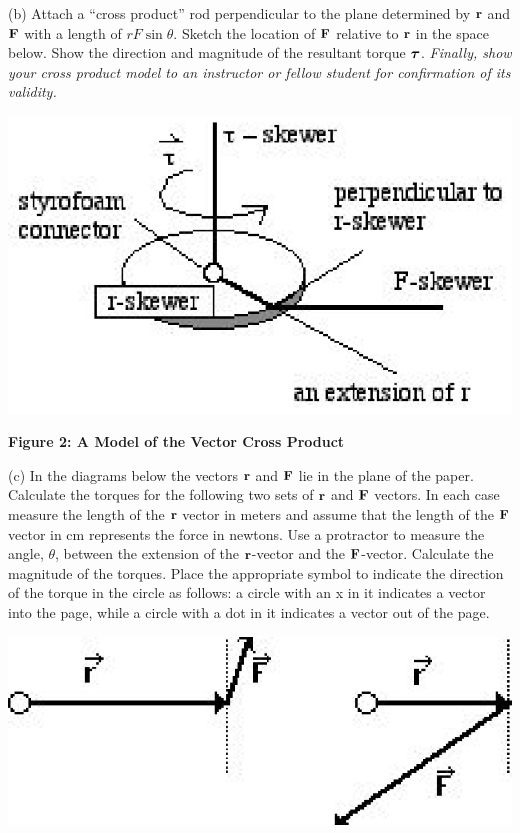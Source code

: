 (b) Attach a ``cross product'' rod perpendicular to the plane
determined by \( {\bf r} \) and \( {\bf F} \) with a
length of $rF\sin \theta$. Sketch the location of \( {\bf F} \)
relative to \( {\bf r} \) in the space below. Show the direction
and magnitude of the resultant torque \( {\mbox{\boldmath$\tau$} } \). \textit{Finally,
show your cross product model to an instructor or fellow student for confirmation
of its validity. }

\vspace{0.3cm}
{\par\centering \includegraphics{ang_mom_fig4.eps} \par}
\vspace{0.3cm}

\textbf{Figure 2: A Model of the Vector Cross Product}

(c) In the diagrams below the vectors \( {\bf r} \) and \( {\bf F} \)
lie in the plane of the paper. Calculate the torques for the following two sets
of \( {\bf r} \) and \( {\bf F} \) vectors. In each
case measure the length of the \( {\bf r} \) vector in meters and
assume that the length of the \( {\bf F} \) vector in cm represents
the force in newtons. Use a protractor to measure the angle, \( \theta  \),
between the extension of the \( {\bf r} \)-vector and the \( {\bf F} \)-vector.
Calculate the magnitude of the torques. Place the appropriate symbol to indicate
the direction of the torque in the circle as follows: a circle with an x in
it indicates a vector into the page, while a circle with a dot in it indicates
a vector out of the page.

\vspace{0.3cm}
{\par\centering \includegraphics{ang_mom_fig5.eps} \par}
\vspace{0.3cm}

